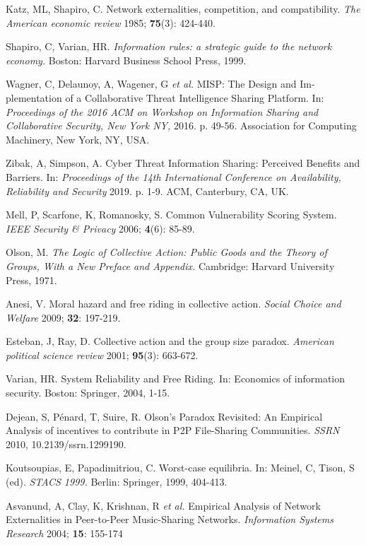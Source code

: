 \documentclass[unnumsec,webpdf,contemporary,large]{oup-authoring-template}%
\theoremstyle{thmstyleone}%
\theoremstyle{thmstyletwo}%
\theoremstyle{thmstylethree}%
\begin{document}
\begin{thebibliography}{10}
Katz, ML, Shapiro, C. Network externalities, competition, and compatibility. {\em The American economic review} 1985; {\bf 75}(3): 424-440.

Shapiro, C, Varian, HR. {\em Information rules: a strategic guide to the network economy.} Boston: Harvard Business School Press, 1999.

Wagner, C, Delaunoy, A, Wagener, G {\em et al.} MISP: The Design and Im-
plementation of a Collaborative Threat Intelligence Sharing Platform. In: {\em Proceedings
of the 2016 ACM on Workshop on Information Sharing and Collaborative Security, New York NY,} 2016. p. 49-56. Association for Computing Machinery, New York, NY, USA.

Zibak, A, Simpson, A. Cyber Threat Information Sharing: Perceived Benefits and Barriers. In: {\em Proceedings of the 14th International Conference on Availability,
Reliability and Security} 2019. p. 1-9. ACM, Canterbury, CA, UK.

Mell, P, Scarfone, K, Romanosky, S. Common Vulnerability Scoring System. {\em IEEE Security \& Privacy} 2006; {\bf 4}(6): 85-89.

Olson, M. {\em The Logic of Collective Action: Public Goods and the Theory of Groups,
With a New Preface and Appendix.} Cambridge: Harvard University Press, 1971.

Anesi, V. Moral hazard and free riding in collective action. {\em Social Choice and Welfare} 2009; {\bf 32}: 197-219.

Esteban, J, Ray, D. Collective action and the group size paradox. {\em American political science review} 2001; {\bf 95}(3): 663-672.

Varian, HR. System Reliability and Free Riding. In: Economics of information security. Boston: Springer, 2004, 1-15.

Dejean, S, P\'enard, T, Suire, R. Olson’s Paradox Revisited: An Empirical Analysis
of incentives to contribute in P2P File-Sharing Communities. {\em SSRN} 2010, 10.2139/ssrn.1299190.

Koutsoupias, E, Papadimitriou, C. Worst-case equilibria. In: Meinel, C, Tison, S (ed). {\em STACS 1999.} Berlin: Springer, 1999, 404-413.

Asvanund, A, Clay, K, Krishnan, R {\em et al.} Empirical Analysis of Network Externalities in Peer-to-Peer Music-Sharing Networks. {\em Information Systems
Research} 2004; {\bf 15}: 155-174


\end{thebibliography}
\end{document}
